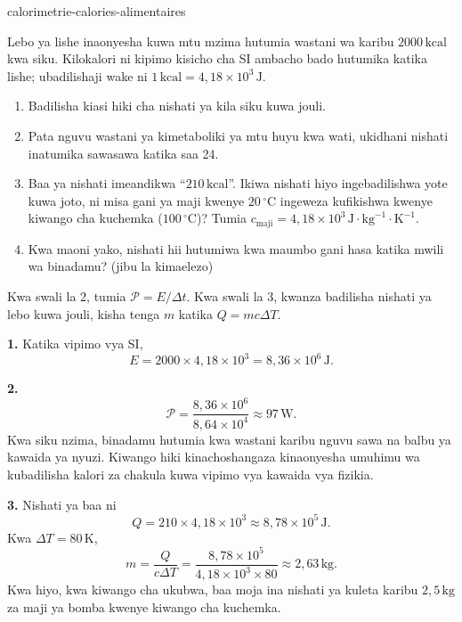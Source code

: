 \begin{exo}{calorimetrie-calories-alimentaires}

Lebo ya lishe inaonyesha kuwa mtu mzima hutumia wastani wa karibu $2000\,\text{kcal}$ kwa siku. Kilokalori ni kipimo kisicho cha SI ambacho bado hutumika katika lishe; ubadilishaji wake ni $1\,\text{kcal}=4{,}18\times10^3\,\text{J}$.

\begin{enumerate}
  \item Badilisha kiasi hiki cha nishati ya kila siku kuwa jouli.
  \item Pata nguvu wastani ya kimetaboliki ya mtu huyu kwa wati, ukidhani nishati inatumika sawasawa katika saa 24.
  \item Baa ya nishati imeandikwa ``$210\,\text{kcal}$''. Ikiwa nishati hiyo ingebadilishwa yote kuwa joto, ni misa gani ya maji kwenye $20\,{}^\circ\text{C}$ ingeweza kufikishwa kwenye kiwango cha kuchemka ($100\,{}^\circ\text{C}$)? Tumia $c_{\text{maji}}=4{,}18\times10^3\,\text{J}\!\cdot\!\text{kg}^{-1}\!\cdot\!\text{K}^{-1}$.
  \item Kwa maoni yako, nishati hii hutumiwa kwa maumbo gani hasa katika mwili wa binadamu? (jibu la kimaelezo)
\end{enumerate}

\begin{indication}
Kwa swali la 2, tumia $\mathcal P=E/\Delta t$. Kwa swali la 3, kwanza badilisha nishati ya lebo kuwa jouli, kisha tenga $m$ katika $Q=mc\Delta T$.
\end{indication}

\begin{solution}
\textbf{1.} Katika vipimo vya SI,
\[
E=2000\times4{,}18\times10^3=8{,}36\times10^6\,\text{J}.
\]

\textbf{2.}
\[
\mathcal P=\frac{8{,}36\times10^6}{8{,}64\times10^4}\approx97\,\text{W}.
\]
Kwa siku nzima, binadamu hutumia kwa wastani karibu nguvu sawa na balbu ya kawaida ya nyuzi. Kiwango hiki kinachoshangaza kinaonyesha umuhimu wa kubadilisha kalori za chakula kuwa vipimo vya kawaida vya fizikia.

\textbf{3.} Nishati ya baa ni
\[
Q=210\times4{,}18\times10^3\approx8{,}78\times10^5\,\text{J}.
\]
Kwa $\Delta T=80\,\text{K}$,
\[
m=\frac{Q}{c\Delta T}
=\frac{8{,}78\times10^5}{4{,}18\times10^3\times80}
\approx2{,}63\,\text{kg}.
\]
Kwa hiyo, kwa kiwango cha ukubwa, baa moja ina nishati ya kuleta karibu $2{,}5\,\text{kg}$ za maji ya bomba kwenye kiwango cha kuchemka.


\end{solution}
\end{exo}
